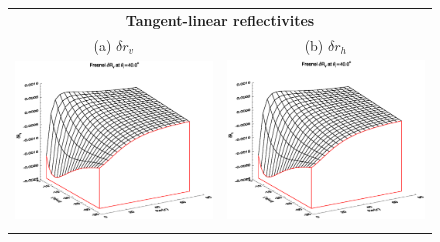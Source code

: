 \begin{figure}[htp]
  \centering
  \begin{tabular}{c c}
    \multicolumn{2}{c}{\sffamily\textbf{Tangent-linear reflectivites}}\\
    \textsf{(a)} $\delta r_v$ &
    \textsf{(b)} $\delta r_h$ \\
    \includegraphics[bb=115 240 508 540,clip,scale=0.5]{graphics/Fresnel/TLAD/rv_TL_z40.0.eps} &
    \includegraphics[bb=115 240 508 540,clip,scale=0.5]{graphics/Fresnel/TLAD/rv_TL_z40.0.eps} \\\\

\end{tabular}
\end{figure}
